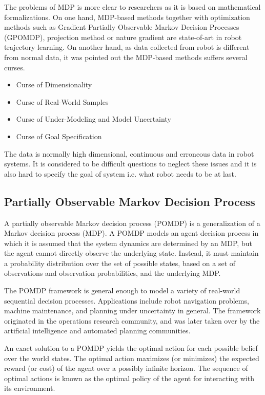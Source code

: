 \documentclass[officiallayout]{tktla}
\begin{document}
The problems of MDP is more clear to researchers as it is based on mathematical formalizations. On one hand, MDP-based methods together with optimization methods such as Gradient Partially Observable Markov Decision Processes (GPOMDP), projection method or nature gradient are state-of-art in robot trajectory learning. On another hand, as data collected from robot is different from normal data, it was pointed out the MDP-based methods suffers several curses\cite{Kober2013}.
\begin{itemize}
\item Curse of Dimensionality
\item Curse of Real-World Samples
\item Curse of Under-Modeling and Model Uncertainty
\item Curse of Goal Specification
\end{itemize}
The data is normally high dimensional, continuous and erroneous data in robot systems. It is considered to be difficult questions to neglect these issues and it is also hard to specify the goal of system i.e. what robot needs to be at last.

\subsection{Partially Observable Markov Decision Process}
A partially observable Markov decision process (POMDP) is a generalization of a Markov decision process (MDP). A POMDP models an agent decision process in which it is assumed that the system dynamics are determined by an MDP, but the agent cannot directly observe the underlying state. Instead, it must maintain a probability distribution over the set of possible states, based on a set of observations and observation probabilities, and the underlying MDP.

The POMDP framework is general enough to model a variety of real-world sequential decision processes. Applications include robot navigation problems, machine maintenance, and planning under uncertainty in general. The framework originated in the operations research community, and was later taken over by the artificial intelligence and automated planning communities.

An exact solution to a POMDP yields the optimal action for each possible belief over the world states. The optimal action maximizes (or minimizes) the expected reward (or cost) of the agent over a possibly infinite horizon. The sequence of optimal actions is known as the optimal policy of the agent for interacting with its environment.
\end{document}
